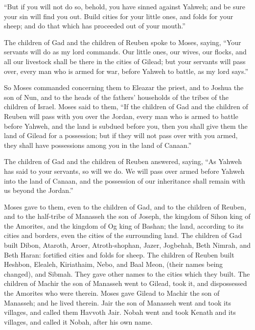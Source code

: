  ``But if you will not do so, behold, you have sinned
against Yahweh; and be sure your sin will find you out. 
Build cities for your little ones, and folds for your sheep; and do that
which has proceeded out of your mouth.''

 The children of Gad and the children of Reuben spoke to
Moses, saying, ``Your servants will do as my lord commands.
 Our little ones, our wives, our flocks, and all our
livestock shall be there in the cities of Gilead;  but
your servants will pass over, every man who is armed for war, before
Yahweh to battle, as my lord says.''

 So Moses commanded concerning them to Eleazar the
priest, and to Joshua the son of Nun, and to the heads of the fathers'
households of the tribes of the children of Israel. 
Moses said to them, ``If the children of Gad and the children of Reuben
will pass with you over the Jordan, every man who is armed to battle
before Yahweh, and the land is subdued before you, then you shall give
them the land of Gilead for a possession;  but if they
will not pass over with you armed, they shall have possessions among you
in the land of Canaan.''

 The children of Gad and the children of Reuben answered,
saying, ``As Yahweh has said to your servants, so will we do.
 We will pass over armed before Yahweh into the land of
Canaan, and the possession of our inheritance shall remain with us
beyond the Jordan.''

 Moses gave to them, even to the children of Gad, and to
the children of Reuben, and to the half-tribe of Manasseh the son of
Joseph, the kingdom of Sihon king of the Amorites, and the kingdom of Og
king of Bashan; the land, according to its cities and borders, even the
cities of the surrounding land.  The children of Gad
built Dibon, Ataroth, Aroer,  Atroth-shophan, Jazer,
Jogbehah,  Beth Nimrah, and Beth Haran: fortified cities
and folds for sheep.  The children of Reuben built
Heshbon, Elealeh, Kiriathaim,  Nebo, and Baal Meon,
(their names being changed), and Sibmah. They gave other names to the
cities which they built.  The children of Machir the son
of Manasseh went to Gilead, took it, and dispossessed the Amorites who
were therein.  Moses gave Gilead to Machir the son of
Manasseh; and he lived therein.  Jair the son of Manasseh
went and took its villages, and called them Havvoth Jair.
 Nobah went and took Kenath and its villages, and called
it Nobah, after his own name.

